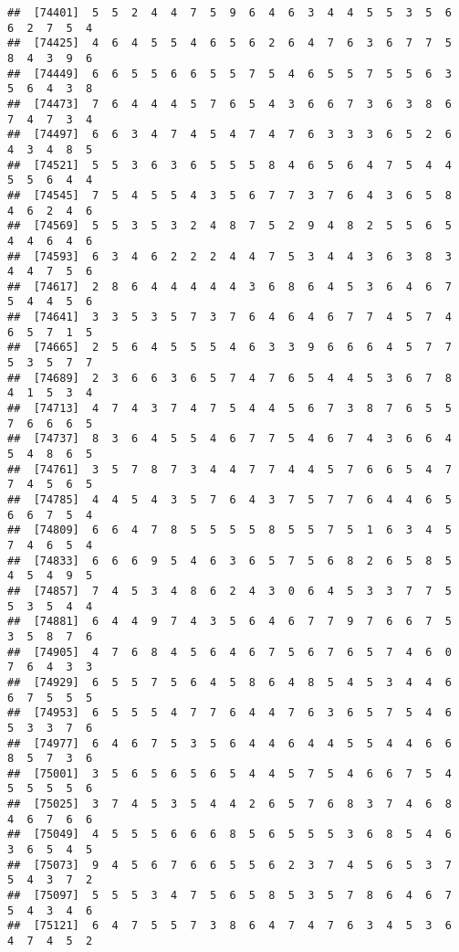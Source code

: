 \documentclass[
]{book}
\begin{document}
\begin{verbatim}
##  [74401]  5  5  2  4  4  7  5  9  6  4  6  3  4  4  5  5  3  5  6  6  2  7  5  4
##  [74425]  4  6  4  5  5  4  6  5  6  2  6  4  7  6  3  6  7  7  5  8  4  3  9  6
##  [74449]  6  6  5  5  6  6  5  5  7  5  4  6  5  5  7  5  5  6  3  5  6  4  3  8
##  [74473]  7  6  4  4  4  5  7  6  5  4  3  6  6  7  3  6  3  8  6  7  4  7  3  4
##  [74497]  6  6  3  4  7  4  5  4  7  4  7  6  3  3  3  6  5  2  6  4  3  4  8  5
##  [74521]  5  5  3  6  3  6  5  5  5  8  4  6  5  6  4  7  5  4  4  5  5  6  4  4
##  [74545]  7  5  4  5  5  4  3  5  6  7  7  3  7  6  4  3  6  5  8  4  6  2  4  6
##  [74569]  5  5  3  5  3  2  4  8  7  5  2  9  4  8  2  5  5  6  5  4  4  6  4  6
##  [74593]  6  3  4  6  2  2  2  4  4  7  5  3  4  4  3  6  3  8  3  4  4  7  5  6
##  [74617]  2  8  6  4  4  4  4  4  3  6  8  6  4  5  3  6  4  6  7  5  4  4  5  6
##  [74641]  3  3  5  3  5  7  3  7  6  4  6  4  6  7  7  4  5  7  4  6  5  7  1  5
##  [74665]  2  5  6  4  5  5  5  4  6  3  3  9  6  6  6  4  5  7  7  5  3  5  7  7
##  [74689]  2  3  6  6  3  6  5  7  4  7  6  5  4  4  5  3  6  7  8  4  1  5  3  4
##  [74713]  4  7  4  3  7  4  7  5  4  4  5  6  7  3  8  7  6  5  5  7  6  6  6  5
##  [74737]  8  3  6  4  5  5  4  6  7  7  5  4  6  7  4  3  6  6  4  5  4  8  6  5
##  [74761]  3  5  7  8  7  3  4  4  7  7  4  4  5  7  6  6  5  4  7  7  4  5  6  5
##  [74785]  4  4  5  4  3  5  7  6  4  3  7  5  7  7  6  4  4  6  5  6  6  7  5  4
##  [74809]  6  6  4  7  8  5  5  5  5  8  5  5  7  5  1  6  3  4  5  7  4  6  5  4
##  [74833]  6  6  6  9  5  4  6  3  6  5  7  5  6  8  2  6  5  8  5  4  5  4  9  5
##  [74857]  7  4  5  3  4  8  6  2  4  3  0  6  4  5  3  3  7  7  5  5  3  5  4  4
##  [74881]  6  4  4  9  7  4  3  5  6  4  6  7  7  9  7  6  6  7  5  3  5  8  7  6
##  [74905]  4  7  6  8  4  5  6  4  6  7  5  6  7  6  5  7  4  6  0  7  6  4  3  3
##  [74929]  6  5  5  7  5  6  4  5  8  6  4  8  5  4  5  3  4  4  6  6  7  5  5  5
##  [74953]  6  5  5  5  4  7  7  6  4  4  7  6  3  6  5  7  5  4  6  5  3  3  7  6
##  [74977]  6  4  6  7  5  3  5  6  4  4  6  4  4  5  5  4  4  6  6  8  5  7  3  6
##  [75001]  3  5  6  5  6  5  6  5  4  4  5  7  5  4  6  6  7  5  4  5  5  5  5  6
##  [75025]  3  7  4  5  3  5  4  4  2  6  5  7  6  8  3  7  4  6  8  4  6  7  6  6
##  [75049]  4  5  5  5  6  6  6  8  5  6  5  5  5  3  6  8  5  4  6  3  6  5  4  5
##  [75073]  9  4  5  6  7  6  6  5  5  6  2  3  7  4  5  6  5  3  7  5  4  3  7  2
##  [75097]  5  5  5  3  4  7  5  6  5  8  5  3  5  7  8  6  4  6  7  5  4  3  4  6
##  [75121]  6  4  7  5  5  7  3  8  6  4  7  4  7  6  3  4  5  3  6  4  7  4  5  2

\end{verbatim}
\end{document}
